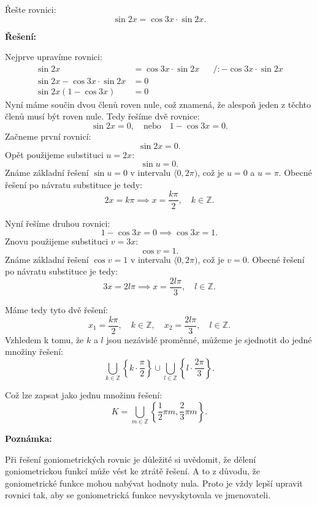 \documentclass[12pt,a4paper]{article}
\begin{document}
\begin{examplebox}
    Řešte rovnici:
    \[
    \sin 2x = \cos 3x \cdot \sin 2x.
    \]

    \medskip
    \textbf{Řešení:}

    Nejprve upravíme rovnici:
    \[
    \begin{aligned}
        \sin 2x &= \cos 3x \cdot \sin 2x  && \big/ : -\cos 3x \cdot \sin 2x \\[0.5em]
        \sin 2x - \cos 3x \cdot \sin 2x &= 0 \\[0.5em]
        \sin 2x (1 - \cos 3x) &= 0
    \end{aligned}
    \]
    Nyní máme součin dvou členů roven nule, což znamená, že alespoň jeden z těchto členů musí být roven nule.
    Tedy řešíme dvě rovnice:
    \[
    \sin 2x = 0, \quad \text{nebo} \quad 1 - \cos 3x = 0.
    \]
    Začneme první rovnicí:
    \[
    \sin 2x = 0.
    \]
    Opět použijeme substituci $u = 2x$:
    \[
    \sin u = 0.
    \]
    Známe základní řešení $\sin u = 0$ v intervalu $\langle 0, 2\pi)$, což je $u = 0$ a $u = \pi$.
    Obecné řešení po návratu substituce je tedy:
    \[
    2x = k\pi \implies x = \frac{k\pi}{2}, \quad k \in \mathbb{Z}.
    \]

    \medskip
    Nyní řešíme druhou rovnici:
    \[
    1 - \cos 3x = 0 \implies \cos 3x = 1.
    \]
    Znovu použijeme substituci $v = 3x$:
    \[
    \cos v = 1.
    \]
    Známe základní řešení $\cos v = 1$ v intervalu $\langle 0, 2\pi)$, což je $v = 0$.
    Obecné řešení po návratu substituce je tedy:
    \[
    3x = 2l\pi \implies x = \frac{2l\pi}{3}, \quad l \in \mathbb{Z}.
    \]
    
    \medskip
    Máme tedy tyto dvě řešení:
    \[
    x_1 = \frac{k\pi}{2}, \quad k \in \mathbb{Z},
    \quad
    x_2 = \frac{2l\pi}{3}, \quad l \in \mathbb{Z}.
    \]
    Vzhledem k tomu, že $k$ a $l$ jsou nezávislé proměnné, můžeme je sjednotit do jedné množiny řešení:
    \[
    \bigcup_{k \in \mathbb{Z}} \left\{k \cdot \frac{\pi}{2}\right\} \cup \bigcup_{l \in \mathbb{Z}} \left\{l \cdot \frac{2\pi}{3}\right\}.
    \]

    Což lze zapsat jako jednu množinu řešení:
    \[
    K = \bigcup_{m \in \mathbb{Z}} \left\{\frac{1}{2}\pi m, \frac{2}{3} \pi m \right\}.
    \]
\end{examplebox}    

\begin{notebox}
    \textbf{Poznámka:}

    Při řešení goniometrických rovnic je důležité si uvědomit, že dělení goniometrickou funkcí může vést ke ztrátě řešení.
    A to z důvodu, že goniometrické funkce mohou nabývat hodnoty nula.
    Proto je vždy lepší upravit rovnici tak, aby se goniometrická funkce nevyskytovala ve jmenovateli.
\end{notebox}
\end{document}
